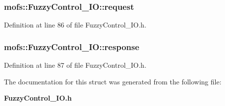 \subsubsection[{request}]{ mofs\-::\-Fuzzy\-Control\-\_\-\-I\-O\-::request}\label{structmofs_1_1FuzzyControl__IO_a42ad357ca0c759a9e1e9abb501f38586}


Definition at line 86 of file Fuzzy\-Control\-\_\-\-I\-O.\-h.

\subsubsection[{response}]{ mofs\-::\-Fuzzy\-Control\-\_\-\-I\-O\-::response}\label{structmofs_1_1FuzzyControl__IO_aff372393f399a7a6ea23ac813fb36462}


Definition at line 87 of file Fuzzy\-Control\-\_\-\-I\-O.\-h.



The documentation for this struct was generated from the following file\-:\begin{DoxyCompactItemize}
\item 
{\bf Fuzzy\-Control\-\_\-\-I\-O.\-h}\end{DoxyCompactItemize}

